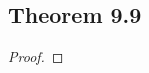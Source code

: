 \documentclass[../../main.tex]{subfiles}
\begin{document}
\subsection{Theorem 9.9}
\begin{wts}

\end{wts}
\begin{proof}

\end{proof}
\end{document}
